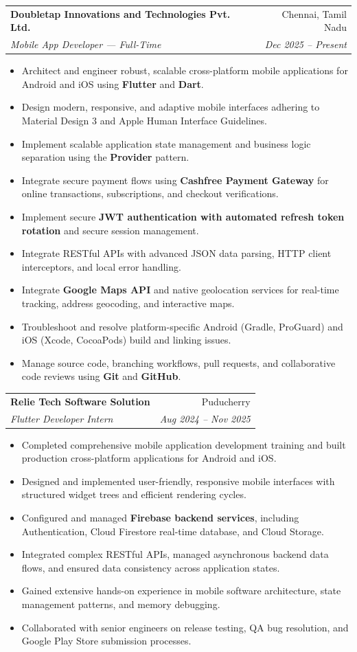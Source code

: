 \documentclass[letterpaper,10pt]{article}
\makeatletter
\newcommand{\resumeItem}[1]{
  \item\small{
    {#1}
  }
}
\newcommand{\resumeSubheading}[4]{
  \vspace{-2pt}\item
    \begin{tabular*}{0.97\textwidth}[t]{l@{\extracolsep{\fill}}r}
      \textbf{#1} & #2 \\
      \textit{\small#3} & \textit{\small #4} \\
    \end{tabular*}\vspace{-6pt}
}
\newcommand{\resumeItemListStart}{\begin{itemize}[leftmargin=0.15in, label=\tiny$\bullet$, noitemsep, topsep=1pt]}
\newcommand{\resumeItemListEnd}{\end{itemize}\vspace{-3pt}}
\makeatother
\begin{document}
    \resumeSubheading
      {Doubletap Innovations and Technologies Pvt. Ltd.}{Chennai, Tamil Nadu}
      {Mobile App Developer --- Full-Time}{Dec 2025 -- Present}
      \resumeItemListStart
        \resumeItem{Architect and engineer robust, scalable cross-platform mobile applications for Android and iOS using \textbf{Flutter} and \textbf{Dart}.}
        \resumeItem{Design modern, responsive, and adaptive mobile interfaces adhering to Material Design 3 and Apple Human Interface Guidelines.}
        \resumeItem{Implement scalable application state management and business logic separation using the \textbf{Provider} pattern.}
        \resumeItem{Integrate secure payment flows using \textbf{Cashfree Payment Gateway} for online transactions, subscriptions, and checkout verifications.}
        \resumeItem{Implement secure \textbf{JWT authentication with automated refresh token rotation} and secure session management.}
        \resumeItem{Integrate RESTful APIs with advanced JSON data parsing, HTTP client interceptors, and local error handling.}
        \resumeItem{Integrate \textbf{Google Maps API} and native geolocation services for real-time tracking, address geocoding, and interactive maps.}
        \resumeItem{Troubleshoot and resolve platform-specific Android (Gradle, ProGuard) and iOS (Xcode, CocoaPods) build and linking issues.}
        \resumeItem{Manage source code, branching workflows, pull requests, and collaborative code reviews using \textbf{Git} and \textbf{GitHub}.}
      \resumeItemListEnd

    \resumeSubheading
      {Relie Tech Software Solution}{Puducherry}
      {Flutter Developer Intern}{Aug 2024 -- Nov 2025}
      \resumeItemListStart
        \resumeItem{Completed comprehensive mobile application development training and built production cross-platform applications for Android and iOS.}
        \resumeItem{Designed and implemented user-friendly, responsive mobile interfaces with structured widget trees and efficient rendering cycles.}
        \resumeItem{Configured and managed \textbf{Firebase backend services}, including Authentication, Cloud Firestore real-time database, and Cloud Storage.}
        \resumeItem{Integrated complex RESTful APIs, managed asynchronous backend data flows, and ensured data consistency across application states.}
        \resumeItem{Gained extensive hands-on experience in mobile software architecture, state management patterns, and memory debugging.}
        \resumeItem{Collaborated with senior engineers on release testing, QA bug resolution, and Google Play Store submission processes.}
      \resumeItemListEnd
\end{document}
